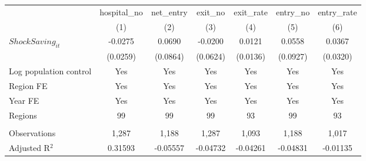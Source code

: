 \begingroup
\centering
\begin{tabular}{lcccccc}
   \toprule
                          & hospital\_no  & net\_entry  & exit\_no  & exit\_rate  & entry\_no  & entry\_rate \\    
                          & (1)           & (2)         & (3)       & (4)         & (5)        & (6)\\  
   \midrule 
   $ShockSaving_{it}$     & -0.0275       & 0.0690      & -0.0200   & 0.0121      & 0.0558     & 0.0367\\   
                          & (0.0259)      & (0.0864)    & (0.0624)  & (0.0136)    & (0.0927)   & (0.0320)\\   
   Log population control & Yes           & Yes         & Yes       & Yes         & Yes        & Yes\\  
   Region FE              & Yes           & Yes         & Yes       & Yes         & Yes        & Yes\\  
   Year FE                & Yes           & Yes         & Yes       & Yes         & Yes        & Yes\\  
   Regions                & 99            & 99          & 99        & 93          & 99         & 93\\  
    \\
   Observations           & 1,287         & 1,188       & 1,287     & 1,093       & 1,188      & 1,017\\  
   Adjusted R$^2$         & 0.31593       & -0.05557    & -0.04732  & -0.04261    & -0.04831   & -0.01135\\  
   \bottomrule
\end{tabular}
\par\endgroup
